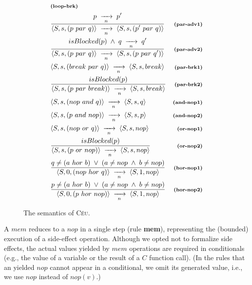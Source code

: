 \documentclass{acm_proc_article-sp}
\newcommand{\CEU}{\textsc{C\'{e}u}\xspace}
\newcommand{\ST}{\1\xrightarrow[~n~]{}\1}
\newcommand{\LL}{\langle}
\newcommand{\RR}{\rangle}
\newcommand{\DS}{\displaystyle}
\newcommand{\rr}[1] {{\textbf{\scriptsize{#1}}}}
\newcommand{\1}{\;}
\newcommand{\2}{\;\;}
\newcommand{\3}{\;\;\;}
\newcommand{\5}{\;\;\;\;\;}
\begin{document}
\begin{figure}
{\begin{eqnarray*}
    & \rr{(loop-brk)}       \\
%
& \frac
    {\DS p \ST p' }
    {\DS \LL S,s, (p~par~q) \RR \ST \LL S,s, (p'~par~q) \RR }
    & \rr{(par-adv1)}      \\
& \frac
    {\DS isBlocked(p) \1\wedge\1 q \ST q' }
    {\DS \LL S,s, (p~par~q) \RR \ST \LL S,s, (p~par~q') \RR }
    & \rr{(par-adv2)}      \\
& \LL S,s, (break~par~q) \RR \ST \LL S,s, break \RR
    & \rr{(par-brk1)}   \\
& \frac
    {\DS isBlocked(p) }
    {\DS \LL S,s, (p~par~break) \RR \ST \LL S,s, break \RR }
    & \rr{(par-brk2)}       \\
& \LL S,s, (nop~and~q) \RR \ST \LL S,s, q \RR
    & \rr{(and-nop1)}   \\
& \LL S,s, (p~and~nop) \RR \ST \LL S,s, p \RR
    & \rr{(and-nop2)}   \\
%
%
& \LL S,s, (nop~or~q) \RR \ST \LL S,s, nop \RR
    & \rr{(or-nop1)}   \\
& \frac
    {\DS isBlocked(p) }
    {\DS \LL S,s, (p~or~nop) \RR \ST \LL S,s, nop \RR }
    & \rr{(or-nop2)}    \\
%
& \frac
    {\DS q \neq (a~hor~b) \1\vee\1 (a \neq nop \1\wedge\1 b \neq nop) }
    {\DS \LL S,0, (nop~hor~q) \RR \ST \LL S,1, nop \RR }
    & \rr{(hor-nop1)}   \\
& \frac
    {\DS p \neq (a~hor~b) \1\vee\1 (a \neq nop \1\wedge\1 b \neq nop) }
    {\DS \LL S,0, (p~hor~nop) \RR \ST \LL S,1, nop \RR }
    & \rr{(hor-nop2)}
%
\end{eqnarray*}
}
%
\caption{ The semantics of \CEU.
\label{fig.sem}
}
\end{figure}

A $mem$ reduces to a $nop$ in a single step (rule \rr{mem}), representing the 
(bounded) execution of a side-effect operation.
Although we opted not to formalize side effects, the actual values yielded by 
$mem$ operations are required in conditionals (e.g., the value of a variable or 
the result of a $C$ function call).
(In the rules that an yielded $nop$ cannot appear in a conditional, we omit its 
generated value, i.e., we use $nop$ instead of $nop(v)$.)
\end{document}
